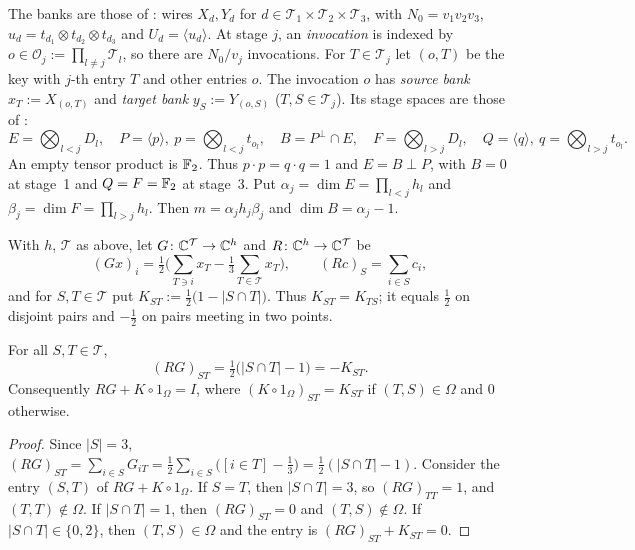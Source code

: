 The banks are those of \cite[\S2.1]{oai}: wires $X_d,Y_d$ for
$d\in\mathcal T_1\times\mathcal T_2\times\mathcal T_3$, with $N_0=v_1v_2v_3$, $u_d=t_{d_1}\otimes
t_{d_2}\otimes t_{d_3}$ and $U_d=\langle u_d\rangle$. At stage $j$, an \emph{invocation} is indexed by
$o\in\mathcal O_j:=\prod_{l\neq j}\mathcal T_l$, so there are $N_0/v_j$ invocations. For
$T\in\mathcal T_j$ let $(o,T)$ be the key with $j$-th entry $T$ and other entries $o$. The invocation
$o$ has \emph{source bank} $x_T:=X_{(o,T)}$ and \emph{target bank} $y_S:=Y_{(o,S)}$
($T,S\in\mathcal T_j$). Its stage spaces are those of \cite[\S2.3]{oai}:
\[
  E=\textstyle\bigotimes_{l<j}D_l,\quad P=\langle p\rangle,\ p=\bigotimes_{l<j}t_{o_l},\quad B=P^\perp\cap E,
  \quad F=\bigotimes_{l>j}D_l,\quad Q=\langle q\rangle,\ q=\bigotimes_{l>j}t_{o_l}.
\]
An empty tensor product is $\mathbb{F}_2$. Thus $p\cdot p=q\cdot q=1$ and $E=B\perp P$, with $B=0$ at stage~1
and $Q=F=\mathbb{F}_2$ at stage~3. Put $\alpha_j=\dim E=\prod_{l<j}h_l$ and $\beta_j=\dim F=\prod_{l>j}h_l$. Then
$m=\alpha_jh_j\beta_j$ and $\dim B=\alpha_j-1$.

\begin{definition}[centres]\label{col:def:centres}
With $h$, $\mathcal T$ as above, let $G\colon\mathbb{C}^{\mathcal T}\to\mathbb{C}^{h}$ and $R\colon\mathbb{C}^{h}\to\mathbb{C}^{\mathcal T}$ be
\[
  (Gx)_i=\tfrac12\Big(\sum_{T\ni i}x_T-\tfrac13\sum_{T\in\mathcal T}x_T\Big),\qquad
  (Rc)_S=\sum_{i\in S}c_i ,
\]
and for $S,T\in\mathcal T$ put $K_{ST}:=\tfrac12\big(1-|S\cap T|\big)$. Thus $K_{ST}=K_{TS}$; it equals
$\tfrac12$ on disjoint pairs and $-\tfrac12$ on pairs meeting in two points.
\end{definition}

\begin{lemma}[$h$ centres]\label{col:lem:centres}
For all $S,T\in\mathcal T$,
\[
  (RG)_{ST}=\tfrac12\big(|S\cap T|-1\big)=-K_{ST}.
\]
Consequently $RG+K\circ 1_\Omega=I$, where $(K\circ1_\Omega)_{ST}=K_{ST}$ if $(T,S)\in\Omega$ and $0$ otherwise.
\end{lemma}

\begin{proof}
Since $|S|=3$,
$(RG)_{ST}=\sum_{i\in S}G_{iT}=\tfrac12\sum_{i\in S}\big([i\in T]-\tfrac13\big)=\tfrac12(|S\cap T|-1)$.
Consider the entry $(S,T)$ of $RG+K\circ1_\Omega$. If $S=T$, then $|S\cap T|=3$, so $(RG)_{TT}=1$, and
$(T,T)\notin\Omega$. If $|S\cap T|=1$, then $(RG)_{ST}=0$ and $(T,S)\notin\Omega$. If $|S\cap T|\in\{0,2\}$,
then $(T,S)\in\Omega$ and the entry is $(RG)_{ST}+K_{ST}=0$.
\end{proof}

